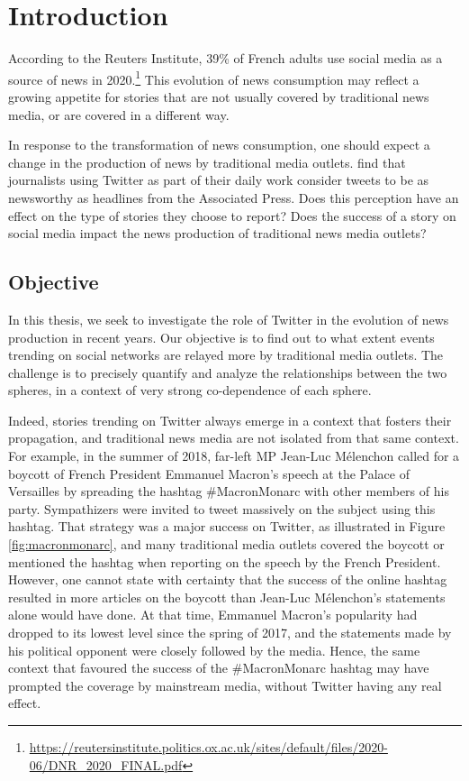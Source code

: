 \chapter{Introduction}
According to the Reuters Institute, 39\% of French adults use social media as a source of news in 2020.\footnote{\url{https://reutersinstitute.politics.ox.ac.uk/sites/default/files/2020-06/DNR_2020_FINAL.pdf}} This evolution of news consumption may reflect a growing appetite for stories that are not usually covered by traditional news media, or are covered in a different way.


In response to the transformation of news consumption, one should expect a change in the production of news by traditional media outlets. \citet{mcgregor_twitter_2018} find that journalists using Twitter as part of their daily work consider tweets to be as newsworthy as headlines from the Associated Press. Does this perception have an effect on the type of stories they choose to report? Does the success of a story on social media impact the news production of traditional news media outlets?

\section{Objective}

In this thesis, we seek to investigate the role of Twitter in the evolution of news production in recent years. Our objective is to find out to what extent events trending on social networks are  relayed more by traditional media outlets. The challenge is to precisely quantify and analyze the relationships between the two spheres, in a context of very strong co-dependence of each sphere.

Indeed, stories trending on Twitter always emerge in a context that fosters their propagation, and traditional news media are not isolated from that same context. For example, in the summer of 2018, far-left MP Jean-Luc Mélenchon called for a boycott of French President Emmanuel Macron's speech at the Palace of Versailles by spreading the hashtag \#MacronMonarc with other members of his party. Sympathizers were invited to tweet massively on the subject using this hashtag. That strategy was a major success on Twitter, as illustrated in Figure \ref{fig:macronmonarc}, and many traditional media outlets covered the boycott or mentioned the hashtag when reporting on the speech by the French President. However, one cannot state with certainty that the success of the online hashtag resulted in more articles on the boycott than Jean-Luc Mélenchon's statements alone would have done. At that time, Emmanuel Macron's popularity had dropped to its lowest level since the spring of 2017, and the statements made by his political opponent were closely followed by the media. Hence, the same context that favoured the success of the \#MacronMonarc hashtag may have prompted the coverage by mainstream media, without Twitter having any real effect. 

